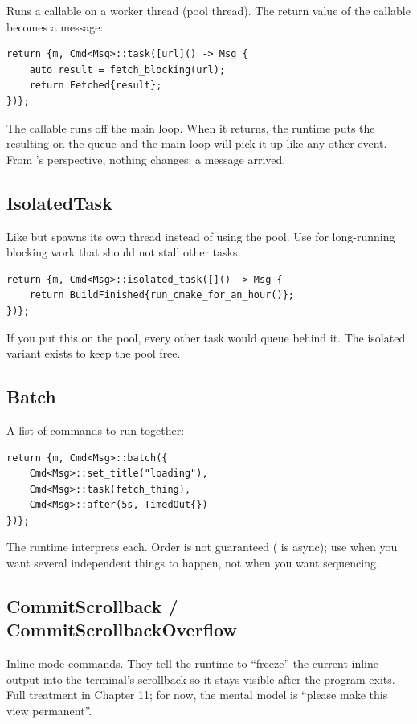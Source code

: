 Runs a callable on a worker thread (pool thread). The return value
of the callable becomes a message:

\begin{lstlisting}
return {m, Cmd<Msg>::task([url]() -> Msg {
    auto result = fetch_blocking(url);
    return Fetched{result};
})};
\end{lstlisting}

The callable runs off the main loop. When it returns, the runtime
puts the resulting  on the queue and the main loop
will pick it up like any other event. From 's
perspective, nothing changes: a message arrived.

\subsection*{IsolatedTask}

Like  but spawns its own thread instead of using the
pool. Use for long-running blocking work that should not stall
other tasks:

\begin{lstlisting}
return {m, Cmd<Msg>::isolated_task([]() -> Msg {
    return BuildFinished{run_cmake_for_an_hour()};
})};
\end{lstlisting}

If you put this on the pool, every other task would queue behind
it. The isolated variant exists to keep the pool free.

\subsection*{Batch}

A list of commands to run together:

\begin{lstlisting}
return {m, Cmd<Msg>::batch({
    Cmd<Msg>::set_title("loading"),
    Cmd<Msg>::task(fetch_thing),
    Cmd<Msg>::after(5s, TimedOut{})
})};
\end{lstlisting}

The runtime interprets each. Order is not guaranteed (
is async); use  when you want several independent
things to happen, not when you want sequencing.

\subsection*{CommitScrollback / CommitScrollbackOverflow}

Inline-mode commands. They tell the runtime to ``freeze'' the
current inline output into the terminal's scrollback so it stays
visible after the program exits. Full treatment in Chapter 11; for
now, the mental model is ``please make this view permanent''.

